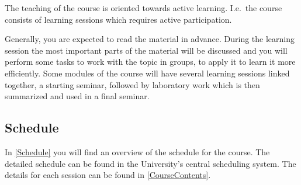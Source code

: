 The teaching of the course is oriented towards active learning.
I.e.\ the course consists of learning sessions which requires active 
participation.

Generally, you are expected to read the material in advance.
During the learning session the most important parts of the material will be 
discussed and you will perform some tasks to work with the topic in groups, 
\ie to apply it to learn it more efficiently.
Some modules of the course will have several learning sessions linked together,
\eg a starting seminar, followed by laboratory work which is then summarized 
and used in a final seminar.

\subsection{Schedule}

In \cref{Schedule} you will find an overview of the schedule for the course.
The detailed schedule can be found in the University's central scheduling 
system.
The details for each session can be found in \cref{CourseContents}.

